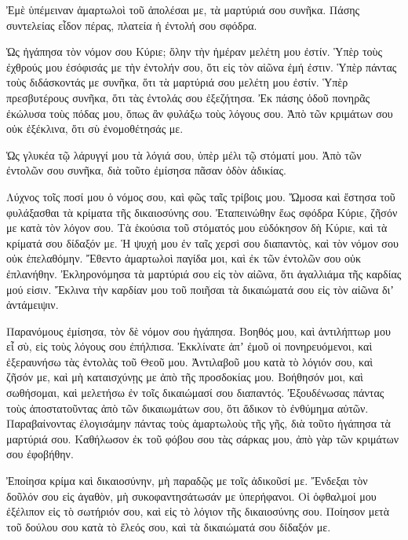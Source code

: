 {Ἐμὲ ὑπέμειναν ἁμαρτωλοὶ τοῦ ἀπολέσαι με, τὰ μαρτύριά σου συνῆκα.
Πάσης συντελείας εἶδον πέρας, πλατεία ἡ ἐντολή σου σφόδρα.
\par }{\PP {}Ὡς ἠγάπησα τὸν νόμον σου Κύριε; ὅλην τὴν ἡμέραν μελέτη μου ἐστίν.
Ὑπὲρ τοὺς ἐχθρούς μου ἐσόφισάς με τὴν ἐντολήν σου, ὅτι εἰς τὸν αἰῶνα ἐμή ἐστιν.
Ὑπὲρ πάντας τοὺς διδάσκοντάς με συνῆκα, ὅτι τὰ μαρτύριά σου μελέτη μου ἐστίν.
Ὑπὲρ πρεσβυτέρους συνῆκα, ὅτι τὰς ἐντολάς σου ἐξεζήτησα.
Ἐκ πάσης ὁδοῦ πονηρᾶς ἐκώλυσα τοὺς πόδας μου, ὅπως ἂν φυλάξω τοὺς λόγους σου.
Ἀπὸ τῶν κριμάτων σου οὐκ ἐξέκλινα, ὅτι σὺ ἐνομοθέτησάς με.
\par }{\PP {}Ὡς γλυκέα τῷ λάρυγγί μου τὰ λόγιά σου, ὑπὲρ μέλι τῷ στόματί μου.
Ἀπὸ τῶν ἐντολῶν σου συνῆκα, διὰ τοῦτο ἐμίσησα πᾶσαν ὁδὸν ἀδικίας.
\par }{\PP {}Λύχνος τοῖς ποσί μου ὁ νόμος σου, καὶ φῶς ταῖς τρίβοις μου.
Ὤμοσα καὶ ἔστησα τοῦ φυλάξασθαι τὰ κρίματα τῆς δικαιοσύνης σου.
Ἐταπεινώθην ἕως σφόδρα Κύριε, ζῆσόν με κατὰ τὸν λόγον σου.
Τὰ ἑκούσια τοῦ στόματός μου εὐδόκησον δὴ Κύριε, καὶ τὰ κρίματά σου δίδαξόν με.
Ἡ ψυχή μου ἐν ταῖς χερσὶ σου διαπαντὸς, καὶ τὸν νόμον σου οὐκ ἐπελαθόμην.
Ἔθεντο ἁμαρτωλοὶ παγίδα μοι, καὶ ἐκ τῶν ἐντολῶν σου οὐκ ἐπλανήθην.
Ἐκληρονόμησα τὰ μαρτύριά σου εἰς τὸν αἰῶνα, ὅτι ἀγαλλιάμα τῆς καρδίας μού εἰσιν.
Ἔκλινα τὴν καρδίαν μου τοῦ ποιῆσαι τὰ δικαιώματά σου εἰς τὸν αἰῶνα διʼ ἀντάμειψιν.
\par }{\PP {}Παρανόμους ἐμίσησα, τὸν δὲ νόμον σου ἠγάπησα.
Βοηθός μου, καὶ ἀντιλήπτωρ μου εἶ σὺ, εἰς τοὺς λόγους σου ἐπήλπισα.
Ἐκκλίνατε ἀπʼ ἐμοῦ οἱ πονηρευόμενοι, καὶ ἐξεραυνήσω τὰς ἐντολὰς τοῦ Θεοῦ μου.
Ἀντιλαβοῦ μου κατὰ τὸ λόγιόν σου, καὶ ζῆσόν με, καὶ μὴ καταισχύνῃς με ἀπὸ τῆς προσδοκίας μου.
Βοήθησόν μοι, καὶ σωθήσομαι, καὶ μελετήσω ἐν τοῖς δικαιώμασί σου διαπαντός.
Ἐξουδένωσας πάντας τοὺς ἀποστατοῦντας ἀπὸ τῶν δικαιωμάτων σου, ὅτι ἄδικον τὸ ἐνθύμημα αὐτῶν.
Παραβαίνοντας ἐλογισάμην πάντας τοὺς ἁμαρτωλοὺς τῆς γῆς, διὰ τοῦτο ἠγάπησα τὰ μαρτύριά σου.
Καθήλωσον ἐκ τοῦ φόβου σου τὰς σάρκας μου, ἀπὸ γὰρ τῶν κριμάτων σου ἐφοβήθην.
\par }{\PP {}Ἐποίησα κρίμα καὶ δικαιοσύνην, μὴ παραδῷς με τοῖς ἀδικοῦσί με.
Ἔνδεξαι τὸν δοῦλόν σου εἰς ἀγαθὸν, μὴ συκοφαντησάτωσάν με ὑπερήφανοι.
Οἱ ὀφθαλμοί μου ἐξέλιπον εἰς τὸ σωτήριόν σου, καὶ εἰς τὸ λόγιον τῆς δικαιοσύνης σου.
Ποίησον μετὰ τοῦ δούλου σου κατὰ τὸ ἔλεός σου, καὶ τὰ δικαιώματά σου δίδαξόν με.
}

